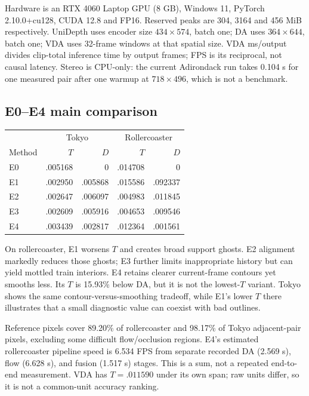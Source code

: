 \documentclass[10pt,twocolumn,letterpaper]{article}
\begin{document}
Hardware is an RTX 4060 Laptop GPU (8 GB), Windows 11, PyTorch 2.10.0+cu128, CUDA 12.8 and FP16. Reserved peaks are 304, 3164 and 456 MiB respectively. UniDepth uses encoder size $434\times574$, batch one; DA uses $364\times644$, batch one; VDA uses 32-frame windows at that spatial size. VDA ms/output divides clip-total inference time by output frames; FPS is its reciprocal, not causal latency. Stereo is CPU-only: the current Adirondack run takes 0.104 s for one measured pair after one warmup at $718\times496$, which is not a benchmark.

\subsection{E0--E4 main comparison}
\begin{center}\begin{minipage}{\linewidth}\centering
{}
\label{tab:main}
\small
\begin{tabular}{lrrrr}
\toprule
&\multicolumn{2}{c}{Tokyo}&\multicolumn{2}{c}{Rollercoaster}\\
Method &$T$&$D$&$T$&$D$\\
\midrule
E0&.005168&0&.014708&0\\
E1&.002950&.005868&.015586&.092337\\
E2&.002647&.006097&.004983&.011845\\
E3&.002609&.005916&.004653&.009546\\
E4&.003439&.002817&.012364&.001561\\
\bottomrule
\end{tabular}
\end{minipage}\end{center}

On rollercoaster, E1 worsens $T$ and creates broad support ghosts. E2 alignment markedly reduces those ghosts; E3 further limits inappropriate history but can yield mottled train interiors. E4 retains clearer current-frame contours yet smooths less. Its $T$ is 15.93\% below DA, but it is not the lowest-$T$ variant. Tokyo shows the same contour-versus-smoothing tradeoff, while E1's lower $T$ there illustrates that a small diagnostic value can coexist with bad outlines.

Reference pixels cover 89.20\% of rollercoaster and 98.17\% of Tokyo adjacent-pair pixels, excluding some difficult flow/occlusion regions. E4's estimated rollercoaster pipeline speed is 6.534 FPS from separate recorded DA (2.569 s), flow (6.628 s), and fusion (1.517 s) stages. This is a sum, not a repeated end-to-end measurement. VDA has $T=.011590$ under its own span; raw units differ, so it is not a common-unit accuracy ranking.
\end{document}
